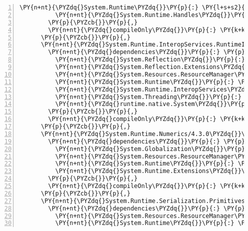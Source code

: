 \begin{Verbatim}[commandchars=\\\{\},numbers=left,firstnumber=1,stepnumber=1,numberblanklines=0]
          \PY{n+nt}{\PYZdq{}System.Runtime\PYZdq{}}\PY{p}{:} \PY{l+s+s2}{\PYZdq{}4.3.0\PYZdq{}}\PY{p}{,}
          \PY{n+nt}{\PYZdq{}System.Runtime.Handles\PYZdq{}}\PY{p}{:} \PY{l+s+s2}{\PYZdq{}4.3.0\PYZdq{}}
        \PY{p}{\PYZcb{}}\PY{p}{,}
        \PY{n+nt}{\PYZdq{}compileOnly\PYZdq{}}\PY{p}{:} \PY{k+kc}{true}
      \PY{p}{\PYZcb{}}\PY{p}{,}
      \PY{n+nt}{\PYZdq{}System.Runtime.InteropServices.RuntimeInformation/4.3.0\PYZdq{}}\PY{p}{:} \PY{p}{\PYZob{}}
        \PY{n+nt}{\PYZdq{}dependencies\PYZdq{}}\PY{p}{:} \PY{p}{\PYZob{}}
          \PY{n+nt}{\PYZdq{}System.Reflection\PYZdq{}}\PY{p}{:} \PY{l+s+s2}{\PYZdq{}4.3.0\PYZdq{}}\PY{p}{,}
          \PY{n+nt}{\PYZdq{}System.Reflection.Extensions\PYZdq{}}\PY{p}{:} \PY{l+s+s2}{\PYZdq{}4.3.0\PYZdq{}}\PY{p}{,}
          \PY{n+nt}{\PYZdq{}System.Resources.ResourceManager\PYZdq{}}\PY{p}{:} \PY{l+s+s2}{\PYZdq{}4.3.0\PYZdq{}}\PY{p}{,}
          \PY{n+nt}{\PYZdq{}System.Runtime\PYZdq{}}\PY{p}{:} \PY{l+s+s2}{\PYZdq{}4.3.0\PYZdq{}}\PY{p}{,}
          \PY{n+nt}{\PYZdq{}System.Runtime.InteropServices\PYZdq{}}\PY{p}{:} \PY{l+s+s2}{\PYZdq{}4.3.0\PYZdq{}}\PY{p}{,}
          \PY{n+nt}{\PYZdq{}System.Threading\PYZdq{}}\PY{p}{:} \PY{l+s+s2}{\PYZdq{}4.3.0\PYZdq{}}\PY{p}{,}
          \PY{n+nt}{\PYZdq{}runtime.native.System\PYZdq{}}\PY{p}{:} \PY{l+s+s2}{\PYZdq{}4.3.0\PYZdq{}}
        \PY{p}{\PYZcb{}}\PY{p}{,}
        \PY{n+nt}{\PYZdq{}compileOnly\PYZdq{}}\PY{p}{:} \PY{k+kc}{true}
      \PY{p}{\PYZcb{}}\PY{p}{,}
      \PY{n+nt}{\PYZdq{}System.Runtime.Numerics/4.3.0\PYZdq{}}\PY{p}{:} \PY{p}{\PYZob{}}
        \PY{n+nt}{\PYZdq{}dependencies\PYZdq{}}\PY{p}{:} \PY{p}{\PYZob{}}
          \PY{n+nt}{\PYZdq{}System.Globalization\PYZdq{}}\PY{p}{:} \PY{l+s+s2}{\PYZdq{}4.3.0\PYZdq{}}\PY{p}{,}
          \PY{n+nt}{\PYZdq{}System.Resources.ResourceManager\PYZdq{}}\PY{p}{:} \PY{l+s+s2}{\PYZdq{}4.3.0\PYZdq{}}\PY{p}{,}
          \PY{n+nt}{\PYZdq{}System.Runtime\PYZdq{}}\PY{p}{:} \PY{l+s+s2}{\PYZdq{}4.3.0\PYZdq{}}\PY{p}{,}
          \PY{n+nt}{\PYZdq{}System.Runtime.Extensions\PYZdq{}}\PY{p}{:} \PY{l+s+s2}{\PYZdq{}4.3.0\PYZdq{}}
        \PY{p}{\PYZcb{}}\PY{p}{,}
        \PY{n+nt}{\PYZdq{}compileOnly\PYZdq{}}\PY{p}{:} \PY{k+kc}{true}
      \PY{p}{\PYZcb{}}\PY{p}{,}
      \PY{n+nt}{\PYZdq{}System.Runtime.Serialization.Primitives/4.3.0\PYZdq{}}\PY{p}{:} \PY{p}{\PYZob{}}
        \PY{n+nt}{\PYZdq{}dependencies\PYZdq{}}\PY{p}{:} \PY{p}{\PYZob{}}
          \PY{n+nt}{\PYZdq{}System.Resources.ResourceManager\PYZdq{}}\PY{p}{:} \PY{l+s+s2}{\PYZdq{}4.3.0\PYZdq{}}\PY{p}{,}
          \PY{n+nt}{\PYZdq{}System.Runtime\PYZdq{}}\PY{p}{:} \PY{l+s+s2}{\PYZdq{}4.3.0\PYZdq{}}

\end{Verbatim}
